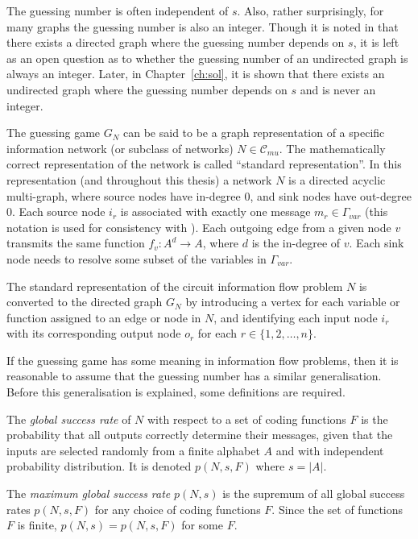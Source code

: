 The guessing number is often independent of $s$. Also, rather surprisingly, for many graphs the guessing number is also an integer. Though it is noted in \cite{riis2005util} that there exists a directed graph where the guessing number depends on $s$, it is left as an open question as to whether the guessing number of an undirected graph is always an integer. Later, in Chapter~\ref{ch:sol}, it is shown that there exists an undirected graph where the guessing number depends on $s$ and is never an integer.

The guessing game $G_N$ can be said to be a graph representation of a specific information network (or subclass of networks) $N \in \mathcal{C}_{mu}$. The mathematically correct representation of the network is called ``standard representation''. In this representation (and throughout this thesis) a network $N$ is a directed acyclic multi-graph, where source nodes have in-degree $0$, and sink nodes have out-degree $0$. Each source node $i_r$ is associated with exactly one message $m_r \in \Gamma_{var}$ (this notation is used for consistency with \cite{riis2005util}). Each outgoing edge from a given node $v$ transmits the same function $f_v : A^d \rightarrow A$, where $d$ is the in-degree of $v$. Each sink node needs to resolve some subset of the variables in $\Gamma_{var}$.

The standard representation of the circuit information flow problem $N$ is converted to the directed graph $G_N$ by introducing a vertex for each variable or function assigned to an edge or node in $N$, and identifying each input node $i_r$ with its corresponding output node $o_r$ for each $r \in \{1, 2, \dots, n\}$.

If the guessing game has some meaning in information flow problems, then it is reasonable to assume that the guessing number has a similar generalisation. Before this generalisation is explained, some definitions are required.

\begin{definition}

The \emph{global success rate} of $N$ with respect to a set of coding functions $F$ is the probability that all outputs correctly determine their messages, given that the inputs are selected randomly from a finite alphabet $A$ and with independent probability distribution. It is denoted $p(N, s, F)$ where $s = |A|$.

\newpage

The \emph{maximum global success rate} $p(N, s)$ is the supremum of all global success rates $p(N, s, F)$ for any choice of coding functions $F$. Since the set of functions $F$ is finite, $p(N, s) = p(N, s, F)$ for some $F$.

\end{definition}

